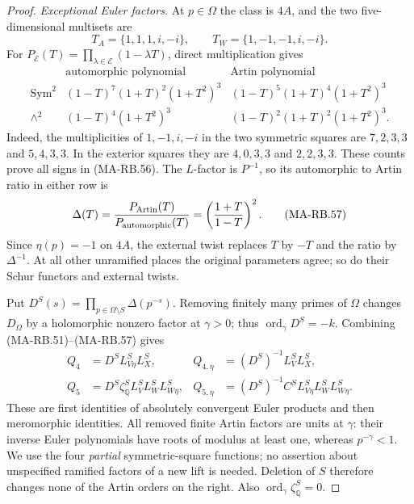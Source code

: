 \begin{proof}
\emph{Exceptional Euler factors.}
At \(p\in\Omega\) the class is \(4A\), and the two
five-dimensional multisets are
\[
        T_A=\{1,1,1,i,-i\},\qquad
        T_W=\{1,-1,-1,i,-i\}.
 \tag{MA-RB.55}
\]
For \(P_{\mathcal E}(T)=\prod_{\lambda\in\mathcal E}
(1-\lambda T)\), direct multiplication gives
\[
 \begin{array}{c|c|c}
 &\text{automorphic polynomial}&\text{Artin polynomial}\\ \hline
 \operatorname{Sym}^2&
 (1-T)^7(1+T)^2(1+T^2)^3&
 (1-T)^5(1+T)^4(1+T^2)^3\\
 \wedge^2&
 (1-T)^4(1+T^2)^3&
 (1-T)^2(1+T)^2(1+T^2)^3 .
 \end{array}
 \tag{MA-RB.56}
\]
Indeed, the multiplicities of \(1,-1,i,-i\) in the
two symmetric squares are \(7,2,3,3\) and \(5,4,3,3\).
In the exterior squares they are \(4,0,3,3\) and
\(2,2,3,3\). These counts prove all signs in (MA-RB.56).
The \(L\)-factor is \(P^{-1}\), so its automorphic to
Artin ratio in either row is
\[
       \Delta(T)=\frac{P_{\rm Artin}(T)}{P_{\rm automorphic}(T)}
                   =\left(\frac{1+T}{1-T}\right)^2 .
 \tag{MA-RB.57}
\]
Since \(\eta(p)=-1\) on \(4A\), the external twist
replaces \(T\) by \(-T\) and the ratio by \(\Delta^{-1}\).
At all other unramified places the original parameters
agree; so do their Schur functors and external twists.

Put \(D^S(s)=\prod_{p\in\Omega\setminus S}\Delta(p^{-s})\).
Removing finitely many primes of \(\Omega\) changes
\(D_\Omega\) by a holomorphic nonzero factor at
\(\gamma>0\); thus \(\operatorname{ord}_\gamma D^S=-k\).
Combining (MA-RB.51)--(MA-RB.57) gives
\[
 \begin{aligned}
 Q_4&=D^S L_{V\eta}^S L_X^S,&
 Q_{4,\eta}&=(D^S)^{-1}L_V^S L_X^S,\\
 Q_5&=D^S\zeta_{\mathbb Q}^S L_V^S L_W^S L_{W\eta}^S,&
 Q_{5,\eta}&=(D^S)^{-1}C^S L_{V\eta}^S L_W^S L_{W\eta}^S .
 \end{aligned}
 \tag{MA-RB.58}
\]
These are first identities of absolutely convergent Euler
products and then meromorphic identities. All removed
finite Artin factors are units at \(\gamma\): their
inverse Euler polynomials have roots of modulus at least
one, whereas \(p^{-\gamma}<1\). We use the four
\emph{partial} symmetric-square functions; no assertion
about unspecified ramified factors of a new lift is needed.
Deletion of \(S\) therefore changes none of the Artin orders
on the right. Also \(\operatorname{ord}_\gamma
\zeta_{\mathbb Q}^S=0\).


\end{proof}
